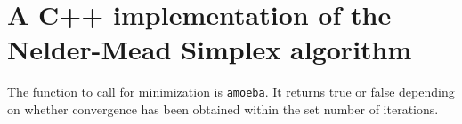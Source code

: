 \documentclass[twoside,english]{uiofysmaster}
\begin{document}
























\appendix

\chapter{A C++ implementation of the Nelder-Mead Simplex algorithm}
\label{ch:simplex}

The function to call for minimization is {\tt amoeba}. It returns true or false depending on whether convergence has been obtained within the set number of iterations.
\end{document}

